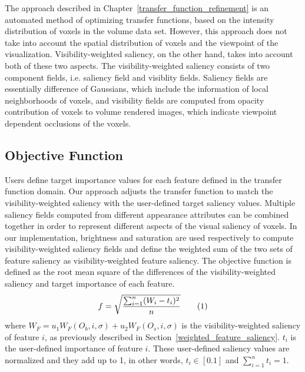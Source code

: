 The approach described in Chapter~\ref{transfer_function_refinement} is an automated method of optimizing transfer functions, based on the intensity distribution of voxels in the volume data set. However, this approach does not take into account the spatial distribution of voxels and the viewpoint of the visualization. Visibility-weighted saliency, on the other hand, takes into account both of these two aspects. The visibility-weighted saliency consists of two component fields, i.e. saliency field and visiblity fields. Saliency fields are essentially difference of Gaussians, which include the information of local neighborhoods of voxels, and visibility fields are computed from opacity contribution of voxels to volume rendered images, which indicate viewpoint dependent occlusions of the voxels.

\subsection{Objective Function}
Users define target importance values for each feature defined in the transfer function domain.
Our approach adjusts the transfer function to match the visibility-weighted saliency with the user-defined target saliency values.
Multiple saliency fields computed from different appearance attributes can be combined together in order to represent different aspects of the visual saliency of voxels.
In our implementation, brightness and saturation are used respectively to compute visibility-weighted saliency fields and define the weighted sum of the two sets of feature saliency as visibility-weighted feature saliency.
The objective function is defined as the root mean square of the differences of the visibility-weighted saliency and target importance of each feature.
\[ f=\sqrt{ \frac{\sum_{i=1}^{n} (W_{i}-t_{i})^{2}}{n} } 
\addtag \]
where $ W_{F}=u_{1}W_{F}(O_{b},i,\sigma)+u_{2}W_{F}(O_{s},i,\sigma) $ is the visibility-weighted saliency of feature $ i $, as previously described in Section~\ref{weighted_feature_saliency}. $ t_{i} $ is the user-defined importance of feature $ i $. These user-defined saliency values are normalized and they add up to 1, in other words, $ t_{i} \in [0.1] $ and $ \sum_{i=1}^{n} t_{i} = 1 $.

